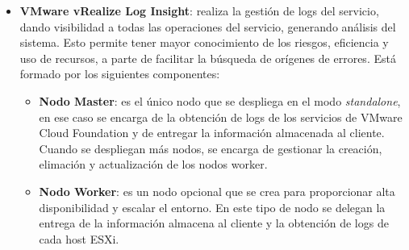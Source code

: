 \begin{itemize}

    \item \textbf{VMware vRealize Log Insight}: realiza la gestión de logs del servicio, dando visibilidad a todas las operaciones del servicio, generando análisis del sistema. Esto permite tener mayor conocimiento de los riesgos, eficiencia y uso de recursos, a parte de facilitar la búsqueda de orígenes de errores. Está formado por los siguientes componentes:
    \begin{itemize}
        \item \textbf{Nodo Master}: es el único nodo que se despliega en el modo \textit{standalone}, en ese caso se encarga de la obtención de logs de los servicios de VMware Cloud Foundation y de entregar la información almacenada al cliente. Cuando se despliegan más nodos, se encarga de gestionar la creación, elimación y actualización de los nodos worker.
        
        \item \textbf{Nodo Worker}: es un nodo opcional que se crea para proporcionar alta disponibilidad y escalar el entorno. En este tipo de nodo se delegan la entrega de la información almacena al cliente y la obtención de logs de cada host ESXi.
        

\end{itemize}
\end{itemize}
